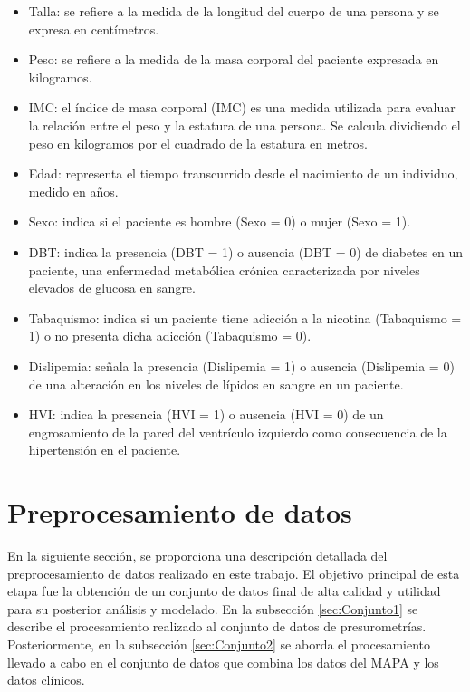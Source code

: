 \begin{itemize}
  \item Talla: se refiere a la medida de la longitud del cuerpo de una persona y se expresa en centímetros.
  \item Peso: se refiere a la medida de la masa corporal del paciente expresada en kilogramos.
  \item IMC: el índice de masa corporal (IMC) es una medida utilizada para evaluar la relación entre el peso y la estatura de una persona. Se calcula dividiendo el peso en kilogramos por el cuadrado de la estatura en metros.
  \item Edad: representa el tiempo transcurrido desde el nacimiento de un individuo, medido en años.
  \item Sexo: indica si el paciente es hombre (Sexo = 0) o mujer (Sexo = 1).
  \item DBT: indica la presencia (DBT = 1) o ausencia (DBT = 0) de diabetes en un paciente, una enfermedad metabólica crónica caracterizada por niveles elevados de glucosa en sangre.
  \item Tabaquismo: indica si un paciente tiene adicción a la nicotina (Tabaquismo = 1) o no presenta dicha adicción (Tabaquismo = 0).
  \item Dislipemia: señala la presencia (Dislipemia = 1) o ausencia (Dislipemia = 0) de una alteración en los niveles de lípidos en sangre en un paciente.
  \item HVI: indica la presencia (HVI = 1) o ausencia (HVI = 0) de un engrosamiento de la pared del ventrículo izquierdo como consecuencia de la hipertensión en el paciente.
\end{itemize}

\section{Preprocesamiento de datos}
En la siguiente sección, se proporciona una descripción detallada del preprocesamiento de datos 
realizado en este trabajo. El objetivo principal de esta etapa fue la obtención de un conjunto de 
datos final de alta calidad y utilidad para su posterior análisis y modelado. En la subsección 
\ref{sec:Conjunto1} se describe el procesamiento realizado al conjunto de datos de presurometrías. 
Posteriormente, en la subsección \ref{sec:Conjunto2} se aborda el procesamiento 
llevado a cabo en el conjunto de datos que combina los datos del MAPA y los datos clínicos.

